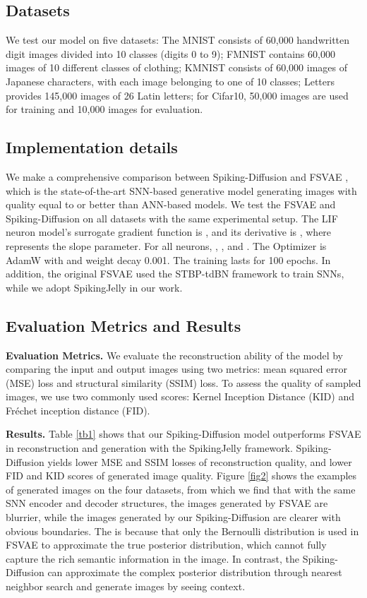 \documentclass{article}
\begin{document}
\subsection{Datasets}
We test our model on five datasets: The MNIST \cite{b20} consists of 60,000 handwritten digit images divided into 10 classes (digits 0 to 9); FMNIST \cite{b31} contains 60,000 images of 10 different classes of clothing; KMNIST \cite{b32} consists of 60,000 images of Japanese characters, with each image belonging to one of 10 classes; Letters \cite{b33} provides 145,000 images of 26 Latin letters; for Cifar10\cite{cifar10}, 50,000 images are used for training and 10,000 images for evaluation.
\subsection{Implementation details}
We make a comprehensive comparison between Spiking-Diffusion and FSVAE \cite{b22}, which is the state-of-the-art SNN-based generative model generating images with quality equal to or better than ANN-based models. We test the FSVAE and Spiking-Diffusion on all datasets with the same experimental setup. The LIF neuron model's surrogate gradient function is , and its derivative is , where  represents the slope parameter. For all neurons, , , and . The Optimizer is AdamW with  and weight decay 0.001. The training lasts for 100 epochs. In addition, the original FSVAE used the STBP-tdBN \cite{b35} framework to train SNNs, while we adopt SpikingJelly \cite{b41} in our work. 

\subsection{Evaluation Metrics and Results}
\textbf{Evaluation Metrics.} We evaluate the reconstruction ability of the model by comparing the input and output images using two metrics: mean squared error (MSE) loss and structural similarity (SSIM) loss. To assess the quality of sampled images, we use two commonly used scores: Kernel Inception Distance (KID) and Fr\'{e}chet inception distance (FID). 

\textbf{Results.} Table \ref{tb1} shows that our Spiking-Diffusion model outperforms FSVAE in reconstruction and generation with the SpikingJelly framework. Spiking-Diffusion yields lower MSE and SSIM losses of reconstruction quality, and lower FID and KID scores of generated image quality. Figure \ref{fig2} shows the examples of generated images on the four datasets, from which we find that with the same SNN encoder and decoder structures, the images generated by FSVAE are blurrier, while the images generated by our Spiking-Diffusion are clearer with obvious boundaries. The is because that only the Bernoulli distribution is used in FSVAE to approximate the true posterior distribution, which cannot fully capture the rich semantic information in the image. In contrast, the Spiking-Diffusion can approximate the complex posterior distribution through nearest neighbor search and generate images by seeing context.
\end{document}
